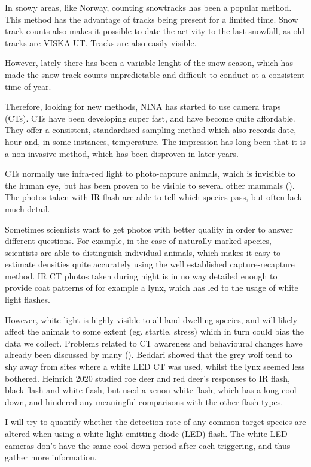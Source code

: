In snowy areas, like Norway, counting snowtracks has been a popular method. This method has the advantage of tracks being present for a limited time. Snow track counts also makes it possible to date the activity to the last snowfall, as old tracks are VISKA UT. Tracks are also easily visible.

However, lately there has been a variable lenght of the snow season, which has made the snow track counts unpredictable and difficult to conduct at a consistent time of year.

Therefore, looking for new methods, NINA has started to use camera traps (CTs). CTs have been developing super fast, and have become quite affordable. They offer a consistent, standardised sampling method which also records date, hour and, in some instances, temperature. 
The impression has long been that it is a non-invasive method, which has been disproven in later years.

CTs normally use infra-red light to photo-capture animals, which is invisible to the human eye, but has been proven to be visible to several other mammals (\cite{Meek2014}). The photos taken with IR flash are able to tell which species pass, but often lack much detail.

Sometimes scientists want to get photos with better quality in order to answer different questions. For example, in the case of naturally marked species, scientists are able to distinguish individual animals, which makes it easy to estimate densities quite accurately using the well established capture-recapture method.
IR CT photos taken during night is in no way detailed enough to provide coat patterns of for example a lynx, which has led to the usage of white light flashes.


However, white light is highly visible to all land dwelling species, and will likely affect the animals to some extent (eg. startle, stress) which in turn could bias the data we collect. Problems related to CT awareness and behavioural changes have already been discussed by many (). Beddari showed that the grey wolf tend to shy away from sites where a white LED CT was used, whilst the lynx seemed less bothered. Heinrich 2020 studied roe deer and red deer's responses to IR flash, black flash and white flash, but used a xenon white flash, which has a long cool down, and hindered any meaningful comparisons with the other flash types.


I will try to quantify whether the detection rate of any common target species are altered when using a white light-emitting diode (LED) flash. The white LED cameras don't have the same cool down period after each triggering, and thus gather more information. 





